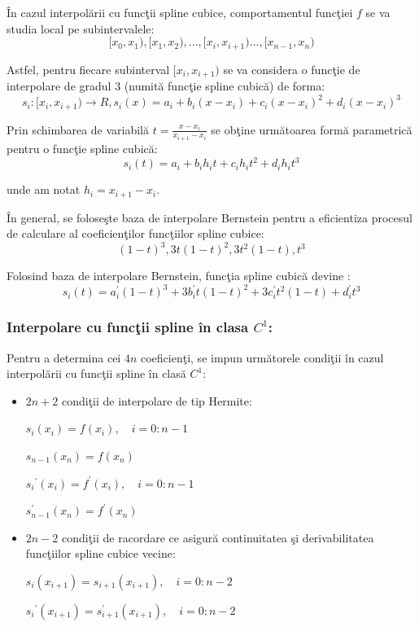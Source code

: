\documentclass{exam}
\begin{document}
În cazul interpolării cu funcţii spline cubice, comportamentul funcţiei $f$ se va studia local pe subintervalele:
$$[x_0,x_1), [x_1,x_2), ...,[x_i,x_{i+1})..., [x_{n-1},x_{n})$$

Astfel, pentru fiecare subinterval $[x_i,x_{i+1})$ se va considera o funcţie de interpolare de gradul 3 (numită funcţie spline cubică) de forma:$$s_i:[x_i,x_{i+1}) \rightarrow R,
	s_i(x) = a_i + b_i(x-x_i) + c_i(x-x_i)^2 + d_i(x-x_i)^3$$

Prin schimbarea de variabilă $t= \frac{x-x_i}{x_{i+1}-x_i}$ se obţine următoarea formă parametrică pentru o funcţie spline cubică:
$$s_i(t) = a_i + b_i h_i t + c_i h_i t^2 + d_i h_i t^3$$

\noindent unde am notat $h_i = x_{i+1}-x_i$.

În general, se foloseşte baza de interpolare Bernstein pentru a eficientiza procesul de calculare al coeficienţilor funcţiilor spline cubice:
$$(1-t)^3,3t(1-t)^2,3t^2(1-t),t^3$$

Folosind baza de interpolare Bernstein, funcţia spline cubică devine		:
$$s_i(t) = a_i^{'} (1-t)^3 + 3b_i^{'}t(1-t)^2 + 3c_i^{'}t^2(1-t) + d_i^{'}t^3$$

\subsubsection{Interpolare cu funcţii spline în clasa $C^1$:}
Pentru a determina cei $4n$ coeficienţi, se impun următorele condiţii în cazul interpolării cu funcţii spline în clasă $C^1$:\begin{itemize}
	\item $2n+2$ condiţii de interpolare de tip Hermite:
	      \begin{center}
		      $s_i(x_i) = f(x_i), \quad i = 0:n-1$
	      \end{center}
	      \begin{center}
		      $s_{n-1}(x_n) = f(x_n)$
	      \end{center}
	      \begin{center}
		      ${s_{i}}^{'}(x_i) = f^{'}(x_i), \quad i = 0:n-1$
	      \end{center}
	      \begin{center}
		      ${s^{'}_{n-1}}(x_n) = f^{'}(x_n)$
	      \end{center}

	\item $2n-2$ condiţii de racordare ce asigură continuitatea şi derivabilitatea funcţiilor spline cubice vecine:
	      \begin{center}
		      $s_i(x_{i+1}) = s_{i+1}(x_{i+1}), \quad i = 0:n-2$
	      \end{center}
	      \begin{center}
		      ${s_i}^{'}(x_{i+1}) = {s^{'}_{i+1}}(x_{i+1}), \quad i = 0:n-2$
	      \end{center}
\end{itemize}
\end{document}
